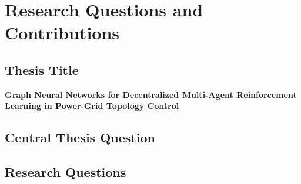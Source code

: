 \chapter{Research Questions and Contributions}

\section{Thesis Title}
\label{sec:plan-title}

\textbf{Graph Neural Networks for Decentralized Multi-Agent Reinforcement
Learning in Power-Grid Topology Control}

\section{Central Thesis Question}
\label{sec:plan-question}


\section{Research Questions}
\label{sec:plan-research-questions}

